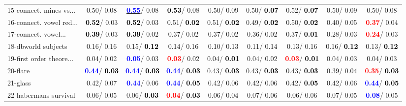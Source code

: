 \begin{table}[h]
\begin{center}
\begin{tabular}{lc|c|c|c|c|c|c|c}
15-connect. mines vs... &   0.50/  0.08 & \underline{\textcolor{blue}{\textbf{  0.55}}}/  0.08 & \textcolor{black}{\textbf{  0.53}}/  0.08 &   0.50/  0.09 &   0.50/\textcolor{black}{\textbf{  0.07}} &   0.52/\textcolor{black}{\textbf{  0.07}} &   0.50/  0.09 &   0.50/  0.08 \\
16-connect. vowel red... & \textcolor{black}{\textbf{  0.52}}/  0.03 & \textcolor{black}{\textbf{  0.52}}/  0.03 &   0.51/\textcolor{black}{\textbf{  0.02}} &   0.51/\textcolor{black}{\textbf{  0.02}} &   0.49/\textcolor{black}{\textbf{  0.02}} &   0.50/\textcolor{black}{\textbf{  0.02}} &   0.40/  0.05 & \textcolor{red}{\textbf{  0.37}}/  0.04 \\
17-connect. vowel... & \textcolor{black}{\textbf{  0.39}}/  0.03 & \textcolor{black}{\textbf{  0.39}}/  0.02 &   0.37/  0.02 &   0.37/  0.02 &   0.36/  0.02 &   0.37/\textcolor{black}{\textbf{  0.01}} &   0.28/  0.03 & \textcolor{red}{\textbf{  0.24}}/  0.03 \\
18-dbworld subjects &   0.16/  0.16 &   0.15/\textcolor{black}{\textbf{  0.12}} &   0.14/  0.16 &   0.10/  0.13 &   0.11/  0.14 &   0.13/  0.16 &   0.16/\textcolor{black}{\textbf{  0.12}} &   0.13/\textcolor{black}{\textbf{  0.12}} \\
19-first order theore... &   0.04/  0.02 & \textcolor{blue}{\textbf{  0.05}}/  0.03 & \textcolor{red}{\textbf{  0.03}}/  0.02 &   0.04/\textcolor{black}{\textbf{  0.01}} &   0.04/  0.02 & \textcolor{red}{\textbf{  0.03}}/\textcolor{black}{\textbf{  0.01}} &   0.04/  0.03 &   0.04/  0.03 \\
20-flare & \textcolor{blue}{\textbf{  0.44}}/\textcolor{black}{\textbf{  0.03}} & \textcolor{blue}{\textbf{  0.44}}/\textcolor{black}{\textbf{  0.03}} & \textcolor{blue}{\textbf{  0.44}}/\textcolor{black}{\textbf{  0.03}} &   0.43/\textcolor{black}{\textbf{  0.03}} &   0.43/\textcolor{black}{\textbf{  0.03}} &   0.43/\textcolor{black}{\textbf{  0.03}} &   0.39/  0.04 & \textcolor{red}{\textbf{  0.35}}/\textcolor{black}{\textbf{  0.03}} \\
21-glass &   0.42/  0.07 & \textcolor{blue}{\textbf{  0.44}}/  0.06 & \textcolor{blue}{\textbf{  0.44}}/\textcolor{black}{\textbf{  0.05}} &   0.42/  0.06 &   0.42/  0.06 &   0.42/\textcolor{black}{\textbf{  0.05}} &   0.42/  0.06 & \textcolor{blue}{\textbf{  0.44}}/\textcolor{black}{\textbf{  0.05}} \\ \hline
22-habermans survival &   0.06/  0.05 &   0.06/\textcolor{black}{\textbf{  0.03}} & \textcolor{red}{\textbf{  0.04}}/\textcolor{black}{\textbf{  0.03}} &   0.06/  0.04 &   0.07/  0.06 &   0.06/  0.06 &   0.07/  0.05 & \textcolor{blue}{\textbf{  0.08}}/  0.05 \\

\end{tabular}
\end{center}
\end{table}
